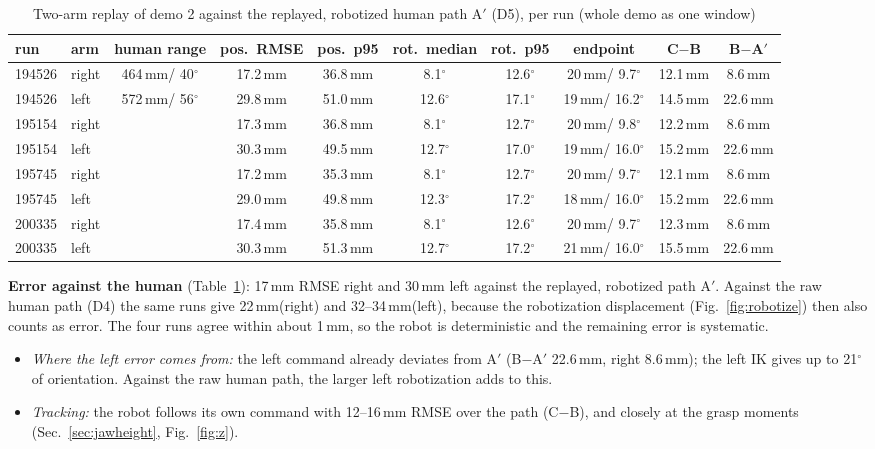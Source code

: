 \documentclass[conference,10pt]{IEEEtran}
\newcommand{\mm}{\,mm\xspace}
\begin{document}
\begin{table}[t]
\caption{Two-arm replay of demo 2 against the replayed, robotized human path A$'$ (D5), per run (whole demo as one window)}\label{tab:rep}
\centering\small
\begin{tabular}{@{}llcccccccc@{}}
\toprule
run & arm & human range & pos.\ RMSE & pos.\ p95 & rot.\ median & rot.\ p95 & endpoint & C$-$B & B$-$A$'$ \\
\midrule
194526 & right & 464\mm / 40$^\circ$ & 17.2\mm & 36.8\mm & 8.1$^\circ$ & 12.6$^\circ$ & 20\mm / 9.7$^\circ$ & 12.1\mm & 8.6\mm \\
194526 & left & 572\mm / 56$^\circ$ & 29.8\mm & 51.0\mm & 12.6$^\circ$ & 17.1$^\circ$ & 19\mm / 16.2$^\circ$ & 14.5\mm & 22.6\mm \\
195154 & right & & 17.3\mm & 36.8\mm & 8.1$^\circ$ & 12.7$^\circ$ & 20\mm / 9.8$^\circ$ & 12.2\mm & 8.6\mm \\
195154 & left & & 30.3\mm & 49.5\mm & 12.7$^\circ$ & 17.0$^\circ$ & 19\mm / 16.0$^\circ$ & 15.2\mm & 22.6\mm \\
195745 & right & & 17.2\mm & 35.3\mm & 8.1$^\circ$ & 12.7$^\circ$ & 20\mm / 9.7$^\circ$ & 12.1\mm & 8.6\mm \\
195745 & left & & 29.0\mm & 49.8\mm & 12.3$^\circ$ & 17.2$^\circ$ & 18\mm / 16.0$^\circ$ & 15.2\mm & 22.6\mm \\
200335 & right & & 17.4\mm & 35.8\mm & 8.1$^\circ$ & 12.6$^\circ$ & 20\mm / 9.7$^\circ$ & 12.3\mm & 8.6\mm \\
200335 & left & & 30.3\mm & 51.3\mm & 12.7$^\circ$ & 17.2$^\circ$ & 21\mm / 16.0$^\circ$ & 15.5\mm & 22.6\mm \\
\bottomrule
\end{tabular}
\end{table}

\textbf{Error against the human} (Table~\ref{tab:rep}): 17\mm RMSE right and 30\mm left against the replayed,
robotized path A$'$. Against the raw human path (D4) the same runs give 22\mm (right) and 32--34\mm (left), because the
robotization displacement (Fig.~\ref{fig:robotize}) then also counts as error. The four runs agree within about 1\mm, so
the robot is deterministic and the remaining error is systematic.
\begin{itemize}
\item \emph{Where the left error comes from:} the left command already deviates from A$'$ (B$-$A$'$ 22.6\mm, right
  8.6\mm); the left IK gives up to 21$^\circ$ of orientation. Against the raw human path, the larger left robotization
  adds to this.
\item \emph{Tracking:} the robot follows its own command with 12--16\mm RMSE over the path (C$-$B), and closely at the
  grasp moments (Sec.~\ref{sec:jawheight}, Fig.~\ref{fig:z}).
\end{itemize}
\end{document}
